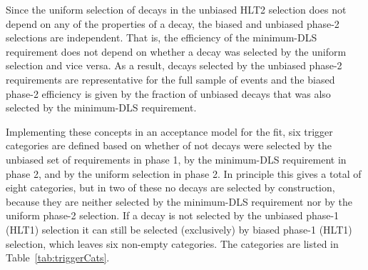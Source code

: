 Since the uniform selection of decays in the unbiased HLT2 selection does not depend on any of the properties of a decay, the biased and
unbiased phase-2 selections are independent. That is, the efficiency of the minimum-DLS requirement does not depend on whether a decay was
selected by the uniform selection and vice versa. As a result, decays selected by the unbiased phase-2 requirements are representative for
the full sample of events and the biased phase-2 efficiency is given by the fraction of unbiased decays that was also selected by the
minimum-DLS requirement.

Implementing these concepts in an acceptance model for the fit, six trigger categories are defined based on whether of not decays were
selected by the unbiased set of requirements in phase 1, by the minimum-DLS requirement in phase 2, and by the uniform selection in phase
2. In principle this gives a total of eight categories, but in two of these no decays are selected by construction, because they are
neither selected by the minimum-DLS requirement nor by the uniform phase-2 selection. If a decay is not selected by the unbiased phase-1
(HLT1) selection it can still be selected (exclusively) by biased phase-1 (HLT1) selection, which leaves six non-empty categories. The
categories are listed in Table~\ref{tab:triggerCats}.
